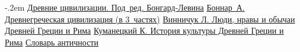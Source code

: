   \begin{thebibliography}{9}
    \itemsep -.2em
     \href{http://padabum.com/x.php?id=9471}{Древние цивилизации.
      Под~ред. Бонгард-Левина}
     \href{http://dwl.alleng.ru/d_ar/hist_vm/hist009_1.zip}{Боннар~А.
      Древнегреческая цивилизация (в 3~частях)}
     \href{http://rghost.ru/download/48161358/%
      1c27882309bef2be09ca96fbc9283bea85743dcd/hist_vm040.zip}{Винничук Л. Люди,
      нравы и обычаи Древней Греции и Рима}
     \href{http://vk.cc/2j6Z3y}{Куманецкий К. История культуры
      Древней Греции и Рима}
     \href{http://rghost.ru/download/48076731/%
      a45295d3ba73f1541079ebf3b1f35a3f9b3e8574/cult013.zip}{Словарь античности}
  \end{thebibliography}

